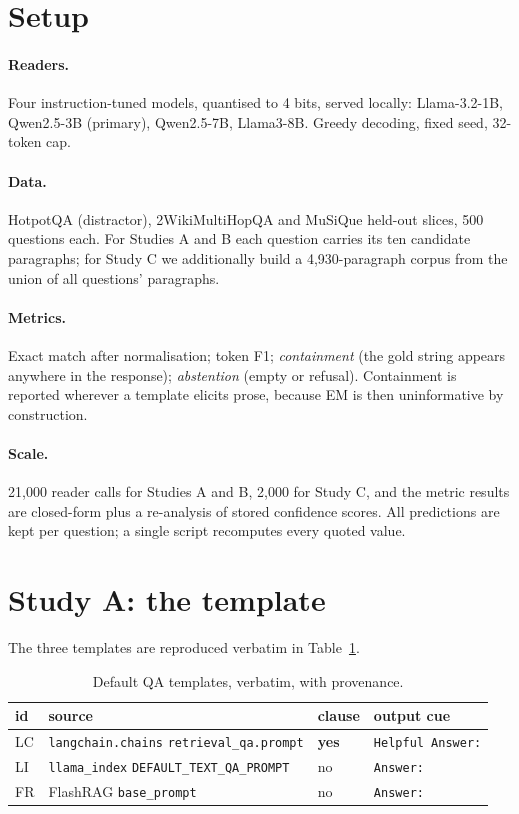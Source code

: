 ﻿\documentclass[11pt]{article}
\begin{document}
\section{Setup}
\label{sec:setup}

\paragraph{Readers.} Four instruction-tuned models, quantised to 4 bits, served locally:
Llama-3.2-1B, Qwen2.5-3B (primary), Qwen2.5-7B, Llama3-8B. Greedy decoding, fixed seed, 32-token
cap.

\paragraph{Data.} HotpotQA (distractor), 2WikiMultiHopQA and MuSiQue held-out slices, 500
questions each. For Studies A and B each question carries its ten candidate paragraphs; for
Study C we additionally build a 4{,}930-paragraph corpus from the union of all questions'
paragraphs.

\paragraph{Metrics.} Exact match after normalisation; token F1; \emph{containment} (the gold
string appears anywhere in the response); \emph{abstention} (empty or refusal). Containment is
reported wherever a template elicits prose, because EM is then uninformative by construction.

\paragraph{Scale.} 21{,}000 reader calls for Studies A and B, 2{,}000 for Study C, and the
metric results are closed-form plus a re-analysis of stored confidence scores. All predictions
are kept per question; a single script recomputes every quoted value.

\section{Study A: the template}
\label{sec:template}

The three templates are reproduced verbatim in Table~\ref{tab:templates}.

\begin{table}[t]
\centering
\caption{Default QA templates, verbatim, with provenance.}
\label{tab:templates}
\small
\begin{tabular}{@{}p{1.0cm}p{6.6cm}p{1.5cm}p{2.6cm}@{}}
\toprule
id & source & clause & output cue \\
\midrule
LC & \texttt{langchain.chains} \texttt{retrieval\_qa.prompt} & \textbf{yes} & \texttt{Helpful Answer:} \\
LI & \texttt{llama\_index} \texttt{DEFAULT\_TEXT\_QA\_PROMPT} & no & \texttt{Answer:} \\
FR & FlashRAG \texttt{base\_prompt} & no & \texttt{Answer:} \\
\bottomrule
\end{tabular}
\end{table}
\end{document}
